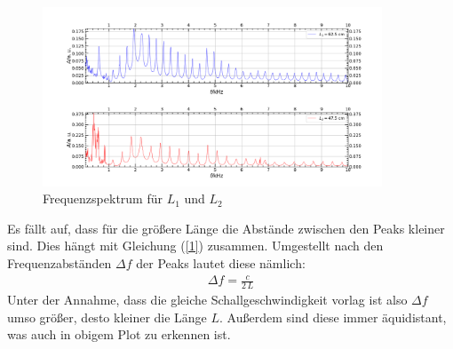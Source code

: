 \documentclass[german,  %
parskip=full,  %
]{scrartcl}
\begin{document}
\begin{figure}[h!]
\centering
\includegraphics[width=0.9\textwidth]{421_Resonanzen.png} 
\caption{Frequenzspektrum für $L_1$ und $L_2$}
\end{figure} 
\[\]
\newpage
Es fällt auf, dass für die größere Länge die Abstände zwischen den Peaks kleiner sind. Dies hängt mit Gleichung (\ref{1}) zusammen. Umgestellt nach den Frequenzabständen $\Delta f$ der Peaks lautet diese nämlich:
\begin{align}
\Delta f = \frac{c}{2\,L} 
\end{align}
Unter der Annahme, dass die gleiche Schallgeschwindigkeit vorlag ist also $\Delta f$ umso größer, desto kleiner die Länge $L$. Außerdem sind diese immer äquidistant, was auch in obigem Plot zu erkennen ist.
\end{document}
